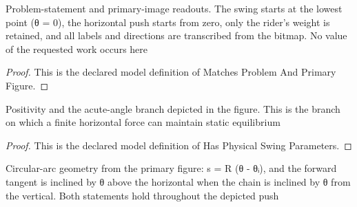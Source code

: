 \begin{definition}
  \label{def:physics:phyx-mini-0809:phyxminiproblems-problemphyxmini0809-matchesproblemandprimaryfigure}
  Problem-statement and primary-image readouts. The swing starts at the lowest point (θ = 0), the horizontal push starts from zero, only the rider's weight is retained, and all labels and directions are transcribed from the bitmap. No value of the requested work occurs here
\end{definition}
\begin{proof}
  This is the declared model definition of Matches Problem And Primary Figure.
\end{proof}
\begin{definition}
  \label{def:physics:phyx-mini-0809:phyxminiproblems-problemphyxmini0809-hasphysicalswingparameters}
  Positivity and the acute-angle branch depicted in the figure. This is the branch on which a finite horizontal force can maintain static equilibrium
\end{definition}
\begin{proof}
  This is the declared model definition of Has Physical Swing Parameters.
\end{proof}
\begin{definition}
  \label{def:physics:phyx-mini-0809:phyxminiproblems-problemphyxmini0809-satisfiescircularswinggeometry}
  Circular-arc geometry from the primary figure: s = R (θ - θᵢ), and the forward tangent is inclined by θ above the horizontal when the chain is inclined by θ from the vertical. Both statements hold throughout the depicted push
\end{definition}
